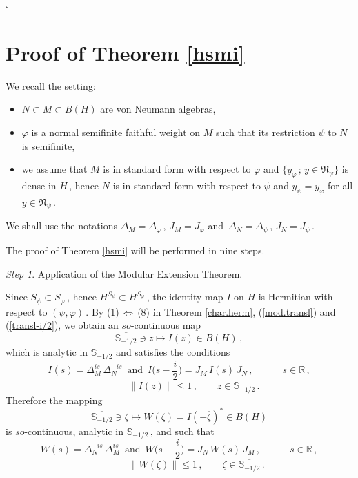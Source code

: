 \documentclass[reqno]{amsart}
\theoremstyle{definition}
\theoremstyle{remark}
\numberwithin{equation}{section}
\theoremstyle{plain}
\begin{document}
\hfill $\square\quad$

\bigskip
\section{Proof of Theorem \ref{hsmi}}
\bigskip

We recall the setting:
\begin{itemize}
\item[--] $N\subset M\subset B(H)$ are von Neumann algebras,
\item[--] $\varphi$ is a normal semifinite faithful weight on $M$
such that its restriction $\psi$ to $N$ is semifinite,
\item[--] we assume that $M$ is in standard form with respect to
$\varphi$ and $\{ y_\varphi\, ;\, y\in\mathfrak N_\psi\}$ is dense
in $H\,$, hence $N$ is in standard form with respect to $\psi$ and
$y_\psi =y_\varphi$ for all $y\in\mathfrak N_\psi\,$.
\end{itemize}
We shall use the notations $\Delta_M =\Delta_\varphi\, ,\, J_M=
J_\varphi$ and $\,\Delta_N =\Delta_\psi\, ,\, J_N=J_\psi\,$.

The proof of Theorem \ref{hsmi} will be performed in nine steps.
\bigskip

{\it Step 1}. {\sc Application of the Modular Extension Theorem.}
\medskip

Since $S_\psi\subset S_\varphi\,$, hence $H^{S_\psi}\subset
H^{S_\varphi}\,$, the identity map $I$ on $H$ is Hermitian with
respect to $(\psi ,\varphi )\,$. By (1)$\,\Leftrightarrow\,$(8) in
Theorem \ref{char.herm}, (\ref{mod.transl}) and (\ref{transl-i/2}),
we obtain an $so$-continuous map
\begin{equation*}
\overline{\mathbb S_{-1/2}}\ni z\longmapsto I(z)\in B(H)\, ,
\end{equation*}
which is analytic in $\mathbb S_{-1/2}$ and satisfies the conditions
\begin{equation*}
I(s)=\Delta_M^{is}\,\Delta_N^{-is}\,\text{ and }\, I\Big(s-\frac i2
\Big) =J_M\, I(s)\, J_N\, ,\qquad\quad s\in\mathbb R\, ,
\end{equation*}
\begin{equation*} \phantom{xxxxx}\,
\| I(z)\|\leq 1\, ,\qquad z\in \overline{\mathbb S_{-1/2}}\, .
\end{equation*}
Therefore the mapping
\begin{equation*}
\overline{\mathbb S_{-1/2}}\ni \zeta\longmapsto W(\zeta )=
I(-\overline{\zeta})^*\in B(H)
\end{equation*}
is $so$-continuous, analytic in $\mathbb S_{-1/2}\,$, and such that
\begin{equation}\label{Wboundary}
W(s)=\Delta_N^{-is}\,\Delta_M^{is}\,\text{ and }\, W\Big(s-\frac i2
\Big) =J_N\, W(s)\, J_M\, ,\qquad\quad s\in\mathbb R\, ,
\end{equation}
\begin{equation}\label{Wbounded} \phantom{xxxxxx}\,
\| W(\zeta )\|\leq 1\, ,\qquad\zeta\in\overline{\mathbb S_{-1/2}}\, .
\end{equation}
\smallskip
\end{document}
